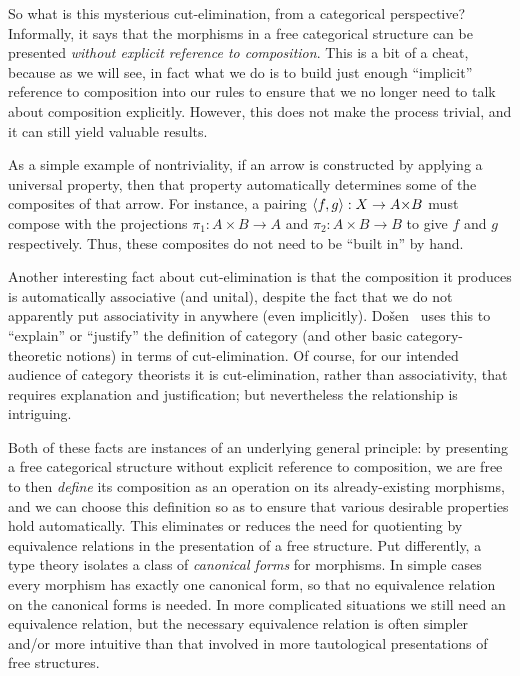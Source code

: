 So what is this mysterious cut-elimination, from a categorical perspective?
Informally, it says that the morphisms in a free categorical structure can be presented \emph{without explicit reference to composition}.
This is a bit of a cheat, because as we will see, in fact what we do is to build just enough ``implicit'' reference to composition into our rules to ensure that we no longer need to talk about composition explicitly.
However, this does not make the process trivial, and it can still yield valuable results.

As a simple example of nontriviality, if an arrow is constructed by applying a universal property, then that property automatically determines some of the composites of that arrow.
For instance, a pairing $\pair{f}{g}:X\to A\times B$ must compose with the projections $\pi_1:A\times B\to A$ and $\pi_2:A\times B\to B$ to give $f$ and $g$ respectively.
Thus, these composites do not need to be ``built in'' by hand.

Another interesting fact about cut-elimination is that the composition it produces is automatically associative (and unital), despite the fact that we do not apparently put associativity in anywhere (even implicitly).
Do\v{s}en~\cite{dosen:cutelim-cats} %
 uses this to ``explain'' or ``justify'' the definition of category (and other basic category-theoretic notions) in terms of cut-elimination.
Of course, for our intended audience of category theorists it is cut-elimination, rather than associativity, that requires explanation and justification; but nevertheless the relationship is intriguing.

Both of these facts are instances of an underlying general principle: by presenting a free categorical structure without explicit reference to composition, we are free to then \emph{define} its composition as an operation on its already-existing morphisms, and we can choose this definition so as to ensure that various desirable properties hold automatically.
This eliminates or reduces the need for quotienting by equivalence relations in the presentation of a free structure.
Put differently, a type theory isolates a class of \emph{canonical forms} for morphisms.
In simple cases every morphism has exactly one canonical form, so that no equivalence relation on the canonical forms is needed.
In more complicated situations we still need an equivalence relation, but the necessary equivalence relation is often simpler and/or more intuitive than that involved in more tautological presentations of free structures.

